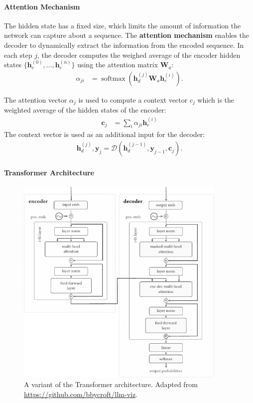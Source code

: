 \paragraph{Attention Mechanism} The hidden state has a fixed size, which limits the amount of information the network can capture about a sequence. The \textbf{attention mechanism} \cite{bahdanau2015neural} enables the decoder to dynamically extract the information from the encoded sequence. In each step $j$, the decoder computes the weighed average of the encoder hidden states $\{\mathbf{h}_e^{(0)}, \ldots, \mathbf{h}_e^{(n)}\}$ using the attention matrix $\mathbf{W}_a$:
\begin{align}
    \alpha_{ji} & = \operatorname{softmax}(\mathbf{h}_d^{(j)}\mathbf{W}_a \mathbf{h}_e^{(i)}).
\end{align}

The attention vector $\alpha_j$ is used to compute a context vector $c_j$ which is the weighted average of the hidden states of the encoder:
\begin{align}
    \mathbf{c}_j & = \sum_i \alpha_{ji} \mathbf{h}_e^{(i)}
\end{align}
The context vector is used as an additional input for the decoder:
\begin{align}
    \mathbf{h}_d^{(j)}, \mathbf{y}_j = \mathcal{D}(\mathbf{h}_d^{(j-1)}, \mathbf{y}_{j-1}, \mathbf{c}_j).
\end{align}



\paragraph{Transformer Architecture}
\begin{figure}[h]
    \centering
    \includegraphics[width=0.9\textwidth]{img/transformer.pdf}
    \caption{A variant of the Transformer architecture. Adapted from \href{https://github.com/bbycroft/llm-viz/blob/main/src/llm/intro-image.svg}{https://github.com/bbycroft/llm-viz}.}
    \label{fig:transformer}
\end{figure}



